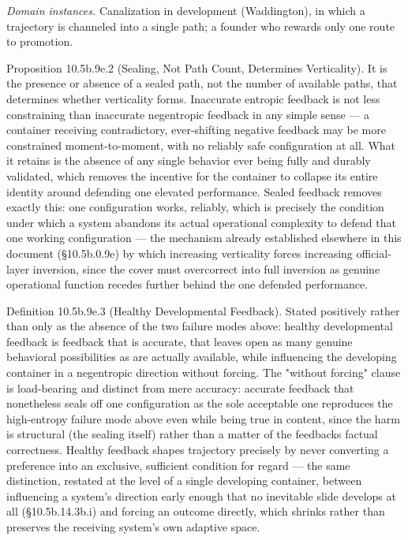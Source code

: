 \documentclass[
]{article}
\begin{document}
\emph{Domain instances.} Canalization in development (Waddington), in
which a trajectory is channeled into a single path; a founder who
rewards only one route to promotion.

Proposition 10.5b.9e.2 (Sealing, Not Path Count, Determines
Verticality). It is the presence or absence of a sealed path, not the
number of available paths, that determines whether verticality forms.
Inaccurate entropic feedback is not less constraining than inaccurate
negentropic feedback in any simple sense --- a container receiving
contradictory, ever-shifting negative feedback may be more constrained
moment-to-moment, with no reliably safe configuration at all. What it
retains is the absence of any single behavior ever being fully and
durably validated, which removes the incentive for the container to
collapse its entire identity around defending one elevated performance.
Sealed feedback removes exactly this: one configuration works, reliably,
which is precisely the condition under which a system abandons its
actual operational complexity to defend that one working configuration
--- the mechanism already established elsewhere in this document
(§10.5b.0.9e) by which increasing verticality forces increasing
official-layer inversion, since the cover must overcorrect into full
inversion as genuine operational function recedes further behind the one
defended performance.

Definition 10.5b.9e.3 (Healthy Developmental Feedback). Stated
positively rather than only as the absence of the two failure modes
above: healthy developmental feedback is feedback that is accurate, that
leaves open as many genuine behavioral possibilities as are actually
available, while influencing the developing container in a negentropic
direction without forcing. The "without forcing" clause is load-bearing
and distinct from mere accuracy: accurate feedback that nonetheless
seals off one configuration as the sole acceptable one reproduces the
high-entropy failure mode above even while being true in content, since
the harm is structural (the sealing itself) rather than a matter of the
feedbacks factual correctness. Healthy feedback shapes trajectory
precisely by never converting a preference into an exclusive, sufficient
condition for regard --- the same distinction, restated at the level of
a single developing container, between influencing a system's direction
early enough that no inevitable slide develops at all (§10.5b.14.3b.i)
and forcing an outcome directly, which shrinks rather than preserves the
receiving system's own adaptive space.
\end{document}
